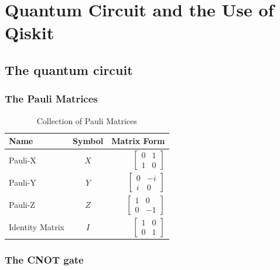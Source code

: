\section{Quantum Circuit and the Use of Qiskit}

\subsection{The quantum circuit}
\label{sec:QuantumCircuit}
\subsubsection{The Pauli Matrices}

\begin{table}[h!]
\centering
\caption{Collection of Pauli Matrices}
\label{tab:gates}
\begin{tabular}{lcr}
\toprule
Name & Symbol & Matrix Form \\
\midrule
Pauli-X & $X$ & $\begin{bmatrix}
    0&1\\1&0
\end{bmatrix}$ \\
\midrule 
Pauli-Y & $Y$ & $\begin{bmatrix}
    0&-i\\i&0
\end{bmatrix}$ \\
\midrule 
Pauli-Z & $Z$ & $\begin{bmatrix}
    1&0\\0&-1
\end{bmatrix}$ \\
\midrule 
Identity Matrix & $I$ & $\begin{bmatrix}
    1&0\\0&1
\end{bmatrix}$\\
\bottomrule
\end{tabular}
\end{table}

\subsubsection{The CNOT gate}

